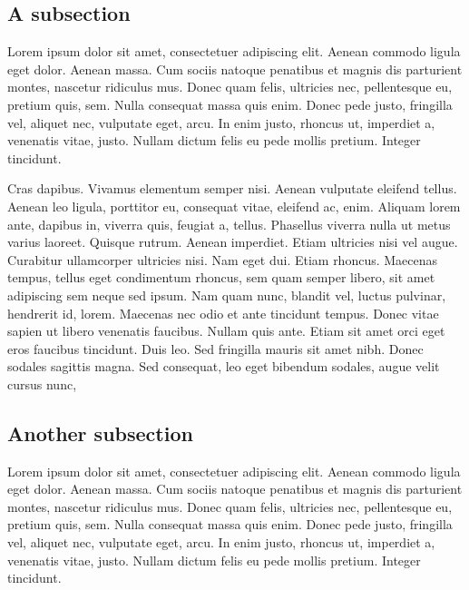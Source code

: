 \documentclass[USenglish]{article}
\begin{document}
\subsection{A subsection} 

Lorem ipsum dolor sit amet, consectetuer adipiscing elit. Aenean commodo ligula eget dolor. Aenean
  massa. Cum sociis natoque penatibus et magnis dis parturient montes, nascetur ridiculus mus. Donec
  quam felis, ultricies nec, pellentesque eu, pretium quis, sem. Nulla consequat massa quis
  enim. Donec pede justo, fringilla vel, aliquet nec, vulputate eget, arcu. In enim justo, rhoncus
  ut, imperdiet a, venenatis vitae, justo. Nullam dictum felis eu pede mollis pretium. Integer
  tincidunt.

  Cras dapibus. Vivamus elementum semper nisi. Aenean vulputate eleifend tellus. Aenean
  leo ligula, porttitor eu, consequat vitae, eleifend ac, enim. Aliquam lorem ante, dapibus in,
  viverra quis, feugiat a, tellus. Phasellus viverra nulla ut metus varius laoreet. Quisque
  rutrum. Aenean imperdiet. Etiam ultricies nisi vel augue. Curabitur ullamcorper ultricies
  nisi. Nam eget dui. Etiam rhoncus. Maecenas tempus, tellus eget condimentum rhoncus, sem quam
  semper libero, sit amet adipiscing sem neque sed ipsum. Nam quam nunc, blandit vel, luctus
  pulvinar, hendrerit id, lorem. Maecenas nec odio et ante tincidunt tempus. Donec vitae sapien ut
  libero venenatis faucibus. Nullam quis ante. Etiam sit amet orci eget eros faucibus
  tincidunt. Duis leo. Sed fringilla mauris sit amet nibh. Donec sodales sagittis magna. Sed
  consequat, leo eget bibendum sodales, augue velit cursus nunc,

\subsection{Another subsection} 

Lorem ipsum dolor sit amet, consectetuer adipiscing elit. Aenean commodo ligula eget dolor. Aenean
  massa. Cum sociis natoque penatibus et magnis dis parturient montes, nascetur ridiculus mus. Donec
  quam felis, ultricies nec, pellentesque eu, pretium quis, sem. Nulla consequat massa quis
  enim. Donec pede justo, fringilla vel, aliquet nec, vulputate eget, arcu. In enim justo, rhoncus
  ut, imperdiet a, venenatis vitae, justo. Nullam dictum felis eu pede mollis pretium. Integer
  tincidunt.
\end{document}
